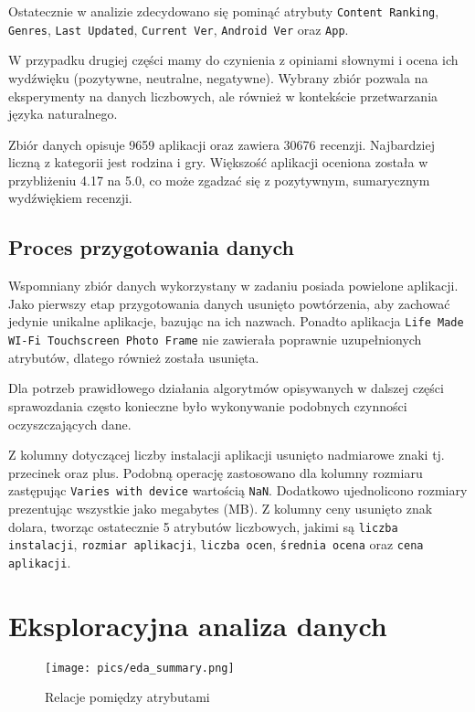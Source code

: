 \documentclass{article}
\begin{document}
Ostatecznie w analizie zdecydowano się pominąć atrybuty \texttt{Content Ranking}, \texttt{Genres}, \texttt{Last Updated}, \texttt{Current Ver}, \texttt{Android Ver} oraz \texttt{App}.

W przypadku drugiej części mamy do czynienia z opiniami słownymi i ocena ich wydźwięku (pozytywne, neutralne, negatywne). Wybrany zbiór pozwala na eksperymenty na danych liczbowych, ale również w kontekście przetwarzania języka naturalnego.

Zbiór danych opisuje 9659 aplikacji oraz zawiera 30676 recenzji. Najbardziej liczną z kategorii jest rodzina i gry. Większość aplikacji oceniona została w przybliżeniu 4.17 na 5.0, co może zgadzać się z pozytywnym, sumarycznym wydźwiękiem recenzji.

\subsection{Proces przygotowania danych}
Wspomniany zbiór danych wykorzystany w zadaniu posiada powielone aplikacji. Jako pierwszy etap przygotowania danych usunięto powtórzenia, aby zachować jedynie unikalne aplikacje, bazując na ich nazwach. Ponadto aplikacja \texttt{Life Made WI-Fi Touchscreen Photo Frame} nie zawierała poprawnie uzupełnionych atrybutów, dlatego również została usunięta.

Dla potrzeb prawidłowego działania algorytmów opisywanych w dalszej części sprawozdania często konieczne było wykonywanie podobnych czynności oczyszczających dane.

Z kolumny dotyczącej liczby instalacji aplikacji usunięto nadmiarowe znaki tj. przecinek oraz plus. Podobną operację zastosowano dla kolumny rozmiaru zastępując \texttt{Varies with device} wartością \texttt{NaN}. Dodatkowo ujednolicono rozmiary prezentując wszystkie jako megabytes (MB). Z kolumny ceny usunięto znak dolara, tworząc ostatecznie 5 atrybutów liczbowych, jakimi są \texttt{liczba instalacji}, \texttt{rozmiar aplikacji}, \texttt{liczba ocen}, \texttt{średnia ocena} oraz \texttt{cena aplikacji}.

\section{Eksploracyjna analiza danych}
\begin{figure}[!h]
\centering
    \texttt{[image: pics/eda\_summary.png]}
    \caption{Relacje pomiędzy atrybutami}
    \label{fig:eda}
\end{figure}
\end{document}
